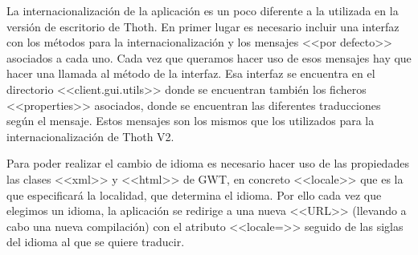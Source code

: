 La internacionalización de la aplicación es un poco diferente a la utilizada en la versión de escritorio de Thoth. En primer lugar es necesario incluir una interfaz con los métodos para la internacionalización y los mensajes <<por defecto>> asociados a cada uno. Cada vez que queramos hacer uso de esos mensajes hay que hacer una llamada al método de la interfaz. Esa interfaz se encuentra en el directorio <<client.gui.utils>> donde se encuentran también los ficheros <<properties>> asociados, donde se encuentran las diferentes traducciones según el mensaje. Estos mensajes son los mismos que los utilizados para la internacionalización de Thoth V2.

Para poder realizar el cambio de idioma es necesario hacer uso de las propiedades las clases <<xml>> y <<html>> de GWT, en concreto <<locale>> que es la que especificará la localidad, que determina el idioma. Por ello cada vez que elegimos un idioma, la aplicación se redirige a una nueva <<URL>> (llevando a cabo una nueva compilación) con el atributo <<locale=>> seguido de las siglas del idioma al que se quiere traducir.